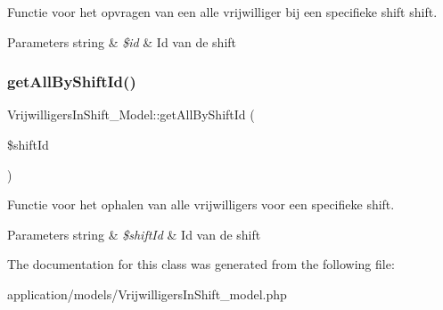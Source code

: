 Functie voor het opvragen van een alle vrijwilliger bij een specifieke shift shift. 
\begin{DoxyParams}[1]{Parameters}
string & {\em \$id} & Id van de shift \\
\hline
\end{DoxyParams}
\mbox{\label{class_vrijwilligers_in_shift___model_a8a9b3e545063a3b69d118ac1109b3da4}} 
\subsubsection{\texorpdfstring{get\+All\+By\+Shift\+Id()}{getAllByShiftId()}}
{\footnotesize\ttfamily Vrijwilligers\+In\+Shift\+\_\+\+Model\+::get\+All\+By\+Shift\+Id (\begin{DoxyParamCaption}\item[{}]{\$shift\+Id }\end{DoxyParamCaption})}

Functie voor het ophalen van alle vrijwilligers voor een specifieke shift. 
\begin{DoxyParams}[1]{Parameters}
string & {\em \$shift\+Id} & Id van de shift \\
\hline
\end{DoxyParams}


The documentation for this class was generated from the following file\+:\begin{DoxyCompactItemize}
\item 
application/models/Vrijwilligers\+In\+Shift\+\_\+model.\+php\end{DoxyCompactItemize}
